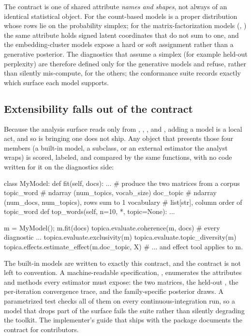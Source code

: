 \documentclass[article]{jss}
\begin{document}
The contract is one of shared attribute \emph{names and shapes}, not always of an
identical statistical object. For the count-based models  is a
proper distribution whose rows lie on the probability simplex; for the
matrix-factorization models (, ) the same attribute holds
signed latent coordinates that do not sum to one, and the embedding-cluster
models expose a hard or soft assignment rather than a generative posterior. The
diagnostics that assume a simplex (for example held-out perplexity) are therefore
defined only for the generative models and refuse, rather than silently
mis-compute, for the others; the conformance suite records exactly which surface
each model supports.

\subsection{Extensibility falls out of the contract}

Because the analysis surface reads only from ,
, , and , adding a model is a
local act, and so is bringing one  does not ship. Any object that
presents those four members (a built-in model, a subclass, or an external
estimator the analyst wraps) is scored, labeled, and compared by the
same functions, with no code written for it on the diagnostics side:

\begin{CodeChunk}
\begin{CodeInput}
class MyModel:
    def fit(self, docs): ...   # produce the two matrices from a corpus
    topic_word                 # ndarray (num_topics, vocab_size)
    doc_topic                  # ndarray (num_docs, num_topics), rows sum to 1
    vocabulary                 # list[str], column order of topic_word
    def top_words(self, n=10, *, topic=None): ...

m = MyModel(); m.fit(docs)
topica.evaluate.coherence(m, docs)          # every diagnostic ...
topica.evaluate.exclusivity(m)
topica.evaluate.topic_diversity(m)
topica.effects.estimate_effect(m.doc_topic, X)   # ... and effect tool applies to m.
\end{CodeInput}
\end{CodeChunk}

The built-in models are written to exactly this contract, and the contract is not
left to convention. A machine-readable specification, ,
enumerates the attributes and methods every estimator must expose: the two
matrices, the held-out , the per-iteration convergence trace, and
the family-specific posterior draws. A parametrized test checks all of them on
every continuous-integration run, so a model that drops part of the surface fails
the suite rather than silently degrading the toolkit. The implementer's guide that
ships with the package documents the contract for contributors.
\end{document}
